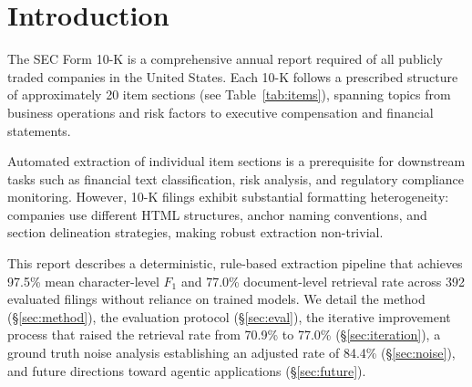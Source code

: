 \documentclass[11pt,a4paper]{article}
\begin{document}
\vspace{8pt}
\tableofcontents
\newpage

\section{Introduction}

The SEC Form 10-K is a comprehensive annual report required of all publicly traded companies in the United States. Each 10-K follows a prescribed structure of approximately 20 item sections (see Table~\ref{tab:items}), spanning topics from business operations and risk factors to executive compensation and financial statements.

Automated extraction of individual item sections is a prerequisite for downstream tasks such as financial text classification, risk analysis, and regulatory compliance monitoring. However, 10-K filings exhibit substantial formatting heterogeneity: companies use different HTML structures, anchor naming conventions, and section delineation strategies, making robust extraction non-trivial.

This report describes a deterministic, rule-based extraction pipeline that achieves 97.5\% mean character-level $F_1$ and 77.0\% document-level retrieval rate across 392 evaluated filings without reliance on trained models. We detail the method (\S\ref{sec:method}), the evaluation protocol (\S\ref{sec:eval}), the iterative improvement process that raised the retrieval rate from 70.9\% to 77.0\% (\S\ref{sec:iteration}), a ground truth noise analysis establishing an adjusted rate of 84.4\% (\S\ref{sec:noise}), and future directions toward agentic applications (\S\ref{sec:future}).
\end{document}
